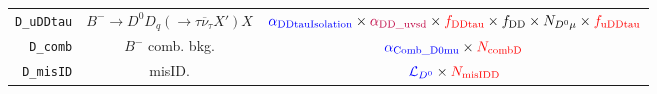 \begin{landscape}
\begin{table}
\begin{tabular}{r|c|c}
       \texttt{D\_uDDtau} &        $B^- \rightarrow D^0 D_q (\rightarrow \tau \overline{\nu}_\tau X') X$         &                                                                            $\textcolor{blue}{\alpha_\text{DDtauIsolation}} \times \textcolor{purple}{\alpha_\text{DD\_uvsd}} \times \textcolor{red}{f_\text{DDtau}} \times f_\text{DD} \times N_{D^0 \mu} \times \textcolor{red}{f_\text{uDDtau}}$                                                                            \\
         \texttt{D\_comb} &                                   $B^-$ comb. bkg.                                   &                                                                                                                                              $\textcolor{blue}{\alpha_\text{Comb\_D0mu}} \times \textcolor{red}{N_\text{combD}}$                                                                                                                                              \\
        \texttt{D\_misID} &                                        misID.                                        &                                                                                                                                                 $\textcolor{blue}{\mathcal{L}_{D^0}} \times \textcolor{red}{N_\text{misIDD}}$                                                                                                                                                 \\
\bottomrule
\end{tabular}

\end{table}
\end{landscape}
\restoregeometry


